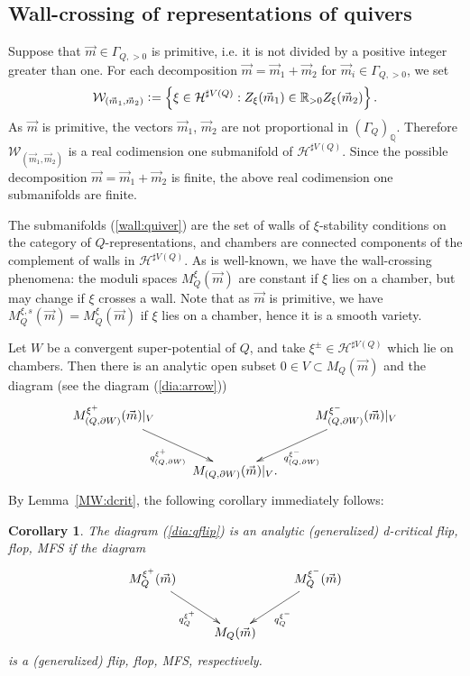\documentclass[11pt]{amsart}
\theoremstyle{plain}
\newtheorem{cor}[thm]{Corollary}
\theoremstyle{definition}
\theoremstyle{remark}
\newcommand{\hH}{\mathcal{H}}
\newcommand{\wW}{\mathcal{W}}
\begin{document}
\subsection{Wall-crossing of representations of quivers}
Suppose that $\vec{m} \in \Gamma_{Q, >0}$ is primitive, 
i.e. it is not divided by 
a positive integer greater than one. 
For each decomposition $\vec{m}=\vec{m}_1+\vec{m}_2$
for $\vec{m}_i \in \Gamma_{Q, >0}$, 
we set
\begin{align}\label{wall:quiver}
\wW_{(\vec{m}_1, \vec{m}_2)}
\cneq \left\{ \xi \in \hH^{\sharp V(Q)} : 
Z_{\xi}(\vec{m}_1) \in \mathbb{R}_{>0} 
Z_{\xi}(\vec{m}_2)\right\}. 
\end{align}
As $\vec{m}$ is primitive, 
the vectors $\vec{m}_1$, $\vec{m}_2$ are not proportional 
in $(\Gamma_{Q})_{\mathbb{Q}}$. 
Therefore $\wW_{(\vec{m}_1, \vec{m}_2)}$ is a real 
codimension one submanifold of $\hH^{\sharp V(Q)}$. 
Since the possible decomposition 
$\vec{m}=\vec{m}_1+\vec{m}_2$ is finite, 
the above real codimension one submanifolds are 
finite. 

The submanifolds (\ref{wall:quiver}) are the 
set of walls of $\xi$-stability conditions on 
the category of $Q$-representations, 
and chambers are connected components 
of the complement of walls in $\hH^{\sharp V(Q)}$. 
As is well-known, we have the wall-crossing phenomena: 
the moduli spaces $M_Q^{\xi}(\vec{m})$ are constant 
if $\xi$ lies on a chamber, but may change if 
$\xi$ crosses a wall. 
Note that as $\vec{m}$ is primitive, we 
have $M_Q^{\xi, s}(\vec{m})=M_Q^{\xi}(\vec{m})$
if $\xi$ lies on a chamber, hence it is a 
smooth variety. 

Let $W$ be a convergent super-potential of $Q$, and 
take $\xi^{\pm} \in \hH^{\sharp V(Q)}$ which 
lie on chambers. 
Then there is an analytic open 
subset $0 \in V \subset M_Q(\vec{m})$
and the diagram (see the diagram (\ref{dia:arrow}))
\begin{align}\label{dia:qflip}
\xymatrix{
M_{(Q, \partial W)}^{\xi^+}(\vec{m})|_{V} \ar[rd]_-{q_{(Q, \partial W)}^{\xi^+}} & & 
M_{(Q, \partial W)}^{\xi^-}(\vec{m})|_{V} 
\ar[ld]^-{q_{(Q, \partial W)}^{\xi^-}} 
\\
& M_{(Q, \partial W)}(\vec{m})|_{V}. &
}
\end{align}
By Lemma~\ref{MW:dcrit}, the following corollary 
immediately follows: 
\begin{cor}\label{cor:dia:qflip}
The diagram (\ref{dia:qflip}) 
is an analytic (generalized) d-critical flip, 
flop, MFS if the diagram
\begin{align}\label{dia:qflip2}
\xymatrix{
M_Q^{\xi^+}(\vec{m}) \ar[rd]_-{q_{Q}^{\xi^+}} & & 
\ar[ld]^-{q_{Q}^{\xi^-}}
M_Q^{\xi^-}(\vec{m}) \\
& M_Q(\vec{m}) &
}
\end{align}
is a (generalized) flip, flop, MFS, respectively. 
\end{cor}
\end{document}
